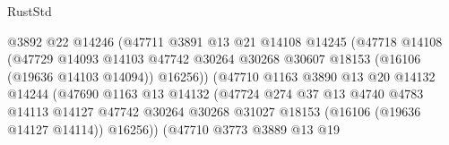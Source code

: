 \begin{lexlean}{RustStd}
\begin{coremodule}
                                      @3892
                                      @22
                                      @14246
                                      (@47711
                                        @3891
                                        @13
                                        @21
                                        @14108
                                        @14245
                                        (@47718
                                          @14108
                                          (@47729
                                            @14093
                                            @14103
                                            @47742
                                            @30264
                                            @30268
                                            @30607
                                            @18153
                                            (@16106 (@19636 @14103 @14094))
                                            @16256))
                                        (@47710
                                          @1163
                                          @3890
                                          @13
                                          @20
                                          @14132
                                          @14244
                                          (@47690
                                            @1163
                                            @13
                                            @14132
                                            (@47724
                                              @274
                                              @37
                                              @13
                                              @4740
                                              @4783
                                              @14113
                                              @14127
                                              @47742
                                              @30264
                                              @30268
                                              @31027
                                              @18153
                                              (@16106 (@19636 @14127 @14114))
                                              @16256))
                                          (@47710
                                            @3773
                                            @3889
                                            @13
                                            @19

\end{coremodule}
\end{lexlean}

